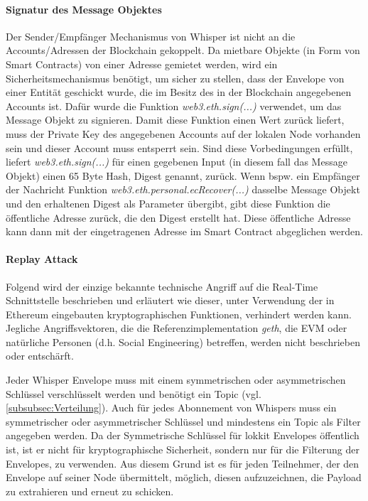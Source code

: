 \paragraph{Signatur des Message Objektes}
Der Sender/Empfänger Mechanismus von Whisper ist nicht an die Accounts/Adressen der Blockchain gekoppelt. Da mietbare Objekte (in Form von Smart Contracts) von einer Adresse gemietet werden, wird ein Sicherheitsmechanismus benötigt, um sicher zu stellen, dass der Envelope von einer Entität geschickt wurde, die im Besitz des in der Blockchain angegebenen Accounts ist. Dafür wurde die Funktion \emph{web3.eth.sign(...)} verwendet, um das Message Objekt zu signieren. Damit diese Funktion einen Wert zurück liefert, muss der Private Key des angegebenen Accounts auf der lokalen Node vorhanden sein und dieser Account muss entsperrt sein. Sind diese Vorbedingungen erfüllt, liefert \emph{web3.eth.sign(...)} für einen gegebenen Input (in diesem fall das Message Objekt) einen 65 Byte Hash, Digest genannt, zurück. Wenn bspw. ein Empfänger der Nachricht Funktion \emph{web3.eth.personal.ecRecover(...)} dasselbe Message Objekt und den erhaltenen Digest als Parameter übergibt, gibt diese Funktion die öffentliche Adresse zurück, die den Digest erstellt hat. Diese öffentliche Adresse kann dann mit der eingetragenen Adresse im Smart Contract abgeglichen werden.\cite[web3.eth/sign, web3.eth.personal/ecRecover]{web3js.readthedocs.io}

\paragraph{Replay Attack}
\label{para:Replay_Attack}
Folgend wird der einzige bekannte technische Angriff auf die Real-Time Schnittstelle beschrieben und erläutert wie dieser, unter Verwendung der in Ethereum eingebauten kryptographischen Funktionen, verhindert werden kann. Jegliche Angriffsvektoren, die die Referenzimplementation \emph{geth}, die \acrshort{EVM} oder natürliche Personen (d.h. Social Engineering) betreffen, werden nicht beschrieben oder entschärft.\cite[web3.eth/sign, web3.eth.personal/ecRecover]{web3js.readthedocs.io}\cite{keccak.noekeon.org}

Jeder Whisper Envelope muss mit einem symmetrischen oder asymmetrischen Schlüssel verschlüsselt werden und benötigt ein Topic (vgl. \ref{subsubsec:Verteilung}).
Auch für jedes Abonnement von Whispers muss ein symmetrischer oder asymmetrischer Schlüssel und mindestens ein Topic als Filter angegeben werden. Da der Symmetrische Schlüssel für lokkit Envelopes öffentlich ist, ist er nicht für kryptographische Sicherheit, sondern nur für die Filterung der Envelopes, zu verwenden. Aus diesem Grund ist es für jeden Teilnehmer, der den Envelope auf seiner Node übermittelt, möglich, diesen aufzuzeichnen, die Payload zu extrahieren und erneut zu schicken.\cite{replay_attack_on_security_protocols}

